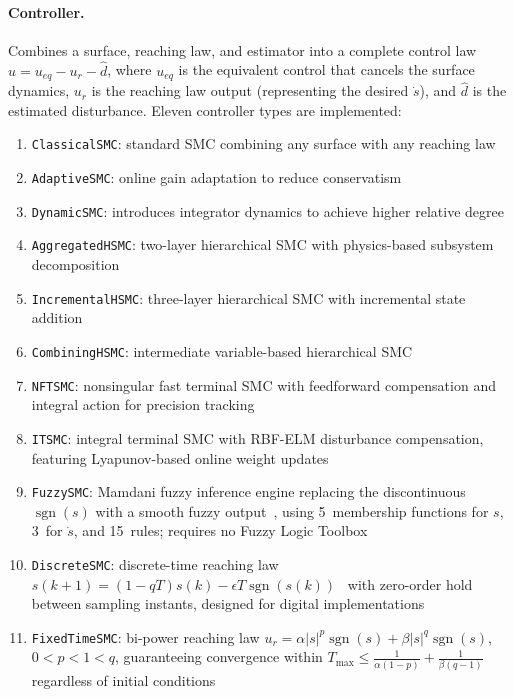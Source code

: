 \documentclass[preprint,12pt]{elsarticle}
\begin{document}
\paragraph{Controller.} Combines a surface, reaching law, and estimator into a complete control law $u = u_{eq} - u_r - \hat{d}$, where $u_{eq}$ is the equivalent control that cancels the surface dynamics, $u_r$ is the reaching law output (representing the desired $\dot{s}$), and $\hat{d}$ is the estimated disturbance. Eleven controller types are implemented:
\begin{enumerate}
    \item \texttt{ClassicalSMC}: standard SMC combining any surface with any reaching law~\cite{utkin1977variable,edwards1998sliding}
    \item \texttt{AdaptiveSMC}: online gain adaptation to reduce conservatism
    \item \texttt{DynamicSMC}: introduces integrator dynamics to achieve higher relative degree
    \item \texttt{AggregatedHSMC}: two-layer hierarchical SMC with physics-based subsystem decomposition~\cite{qian2015hierarchical}
    \item \texttt{IncrementalHSMC}: three-layer hierarchical SMC with incremental state addition~\cite{qian2015hierarchical}
    \item \texttt{CombiningHSMC}: intermediate variable-based hierarchical SMC~\cite{qian2015hierarchical}
    \item \texttt{NFTSMC}: nonsingular fast terminal SMC with feedforward compensation and integral action for precision tracking~\cite{feng2014non}
    \item \texttt{ITSMC}: integral terminal SMC with RBF-ELM disturbance compensation, featuring Lyapunov-based online weight updates
    \item \texttt{FuzzySMC}: Mamdani fuzzy inference engine replacing the discontinuous $\operatorname{sgn}(s)$ with a smooth fuzzy output~\cite{khanesar2021fuzzy}, using 5~membership functions for $s$, 3~for $\dot{s}$, and 15~rules; requires no Fuzzy Logic Toolbox
    \item \texttt{DiscreteSMC}: discrete-time reaching law $s(k\!+\!1) = (1\!-\!qT)s(k) - \epsilon T \operatorname{sgn}(s(k))$~\cite{gao1995discrete} with zero-order hold between sampling instants, designed for digital implementations
    \item \texttt{FixedTimeSMC}: bi-power reaching law $u_r = \alpha |s|^p \operatorname{sgn}(s) + \beta |s|^q \operatorname{sgn}(s)$, $0\!<\!p\!<\!1\!<\!q$, guaranteeing convergence within $T_{\max} \leq \frac{1}{\alpha(1-p)} + \frac{1}{\beta(q-1)}$ regardless of initial conditions~\cite{polyakov2012fixed}
\end{enumerate}
\end{document}
